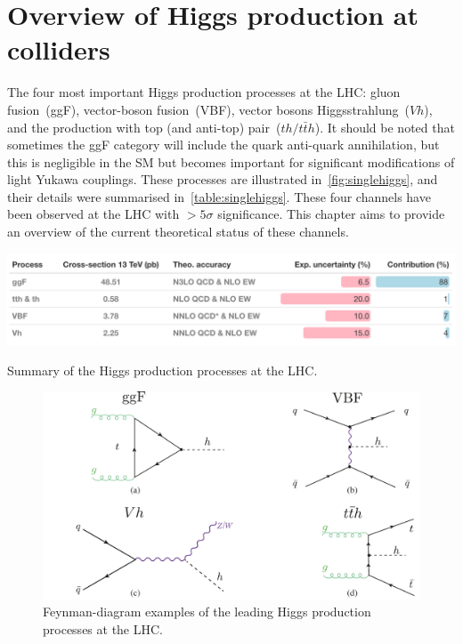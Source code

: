 
\chapter{ Overview of Higgs production at colliders }\label{chap:overviewSingleHiggs}
\par The four most important Higgs production processes at the LHC: gluon fusion~(ggF), vector-boson fusion~(VBF), vector bosons Higgsstrahlung~($Vh$), and the production with top (and anti-top) pair~($th / t \bar th$). It should be noted that sometimes the ggF category will include the quark anti-quark annihilation, but this is negligible in the SM but becomes important for significant modifications of light Yukawa couplings. These processes are illustrated in~\autoref{fig:singlehiggs}, and their details were summarised in~\autoref{table:singlehiggs}. These four channels have been observed at the LHC with $>5 \sigma$ significance. This chapter aims to provide an overview of the current theoretical status of these channels.
\begin{table}[htbp!]
	\includegraphics[width=1\textwidth]{single_higgs_table}
	\caption{ Summary of the Higgs production processes at the LHC. \label{table:singlehiggs} }
\end{table}
\begin{figure}[htbp!]
	\begin{center}
		\includegraphics[width=.75\textwidth]{figures/single_higgs}
		\caption{Feynman-diagram examples of the leading Higgs production processes  at the LHC. \label{fig:singlehiggs} }
	\end{center}
\end{figure}
